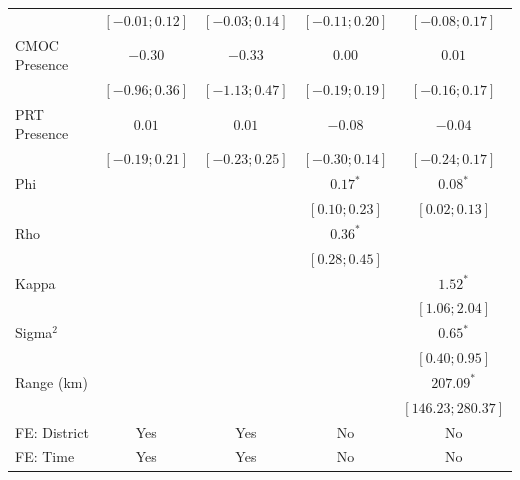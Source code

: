 \documentclass[12pt]{article}
\begin{document}
\begin{table}[!h]
\begin{center}
\begin{footnotesize}
\begin{tabular}{l c c c c}
                            & $ [-0.01;  0.12]$ & $ [-0.03;  0.14]$ & $ [-0.11;  0.20]$ & $ [ -0.08;   0.17]$ \\
CMOC Presence               & $-0.30$           & $-0.33$           & $0.00$            & $0.01$              \\
                            & $ [-0.96;  0.36]$ & $ [-1.13;  0.47]$ & $ [-0.19;  0.19]$ & $ [ -0.16;   0.17]$ \\
PRT Presence                & $0.01$            & $0.01$            & $-0.08$           & $-0.04$             \\
                            & $ [-0.19;  0.21]$ & $ [-0.23;  0.25]$ & $ [-0.30;  0.14]$ & $ [ -0.24;   0.17]$ \\
Phi                         &                   &                   & $0.17^{*}$        & $0.08^{*}$          \\
                            &                   &                   & $ [ 0.10;  0.23]$ & $ [  0.02;   0.13]$ \\
Rho                         &                   &                   & $0.36^{*}$        &                     \\
                            &                   &                   & $ [ 0.28;  0.45]$ &                     \\
Kappa                       &                   &                   &                   & $1.52^{*}$          \\
                            &                   &                   &                   & $ [  1.06;   2.04]$ \\
Sigma$^2$                   &                   &                   &                   & $0.65^{*}$          \\
                            &                   &                   &                   & $ [  0.40;   0.95]$ \\
Range (km)                  &                   &                   &                   & $207.09^{*}$        \\
                            &                   &                   &                   & $ [146.23; 280.37]$ \\
\midrule
FE: District                & Yes               & Yes               & No                & No                  \\
FE: Time                    & Yes               & Yes               & No                & No                  \\

\end{tabular}
\end{footnotesize}
\end{center}
\end{table}
\end{document}
